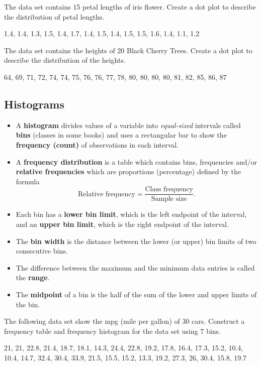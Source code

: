 \begin{example}
The data set contains 15 petal lengths of iris flower. Create a dot plot
to describe the distribution of petal lengths.

1.4, 1.4, 1.3, 1.5, 1.4, 1.7, 1.4, 1.5, 1.4, 1.5, 1.5, 1.6, 1.4, 1.1,
1.2
\end{example}
\vspace*{8\baselineskip}

\begin{exercise}
The data set contains the heights of 20 Black Cherry Trees. Create a dot
plot to describe the distribution of the heights.

64, 69, 71, 72, 74, 74, 75, 76, 76, 77, 78, 80, 80, 80, 80, 81, 82, 85,
86, 87
\end{exercise}
\vspace*{6\baselineskip}

\hypertarget{histograms}{%
\subsection{Histograms}\label{histograms}}

\begin{itemize}
\item
  A \textbf{histogram} divides values of a variable into
  \emph{equal-sized} intervals called \textbf{bins} (classes in some
  books) and uses a rectangular bar to show the \textbf{frequency
  (count)} of observations in each interval.
\item
  A \textbf{frequency distribution} is a table which contains bins,
  frequencies and/or \textbf{relative frequencies} which are proportions
  (percentage) defined by the formula \[
    \text{Relative frequency} =\frac{\text{Class frequency}}{\text{Sample size}}.
  \]
\item
  Each bin has a \textbf{lower bin limit}, which is the left endpoint of
  the interval, and an \textbf{upper bin limit}, which is the right
  endpoint of the interval.
\item
  The \textbf{bin width} is the distance between the lower (or upper)
  bin limits of two consecutive bins.
\item
  The difference between the maximum and the minimum data entries is
  called the \textbf{range}.
\item
  The \textbf{midpoint} of a bin is the half of the sum of the lower and
  upper limits of the bin.
\end{itemize}

\begin{example}
The following data set show the mpg (mile per gallon) of 30 cars.
Construct a frequency table and frequency histogram for the data set
using \(7\) bins.

21, 21, 22.8, 21.4, 18.7, 18.1, 14.3, 24.4, 22.8, 19.2, 17.8, 16.4,
17.3, 15.2, 10.4, 10.4, 14.7, 32.4, 30.4, 33.9, 21.5, 15.5, 15.2, 13.3,
19.2, 27.3, 26, 30.4, 15.8, 19.7
\end{example}
\vspace*{8\baselineskip}

